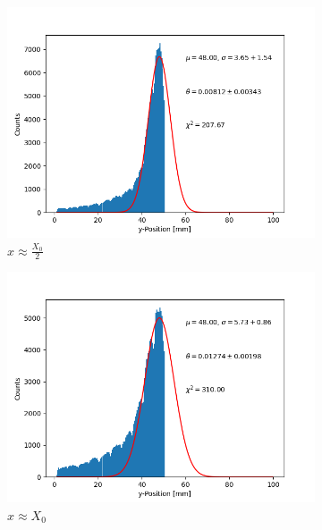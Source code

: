 \documentclass[sn-mathphys-num,iicol]{sn-jnl}
\theoremstyle{thmstyleone}
\theoremstyle{thmstyletwo}
\theoremstyle{thmstylethree}
\begin{document}
\begin{figure}[h]
    \centering
    \begin{subfigure}{0.49\textwidth}
        \includegraphics[width=\textwidth]{../src/elsa/finished_plots/Aluminium, Half Radiation Length, 40cm Distance.png}
        \caption{$x\approx\frac{X_0}{2}$}
    \end{subfigure}
    \begin{subfigure}{0.49\textwidth}
        \includegraphics[width=\textwidth]{../src/elsa/finished_plots/Aluminium, One Radiation Length, 40cm Distance.png}
        \caption{$x\approx X_0$}
    \end{subfigure}
    \begin{subfigure}{0.49\textwidth}

\end{subfigure}
\end{figure}
\end{document}
